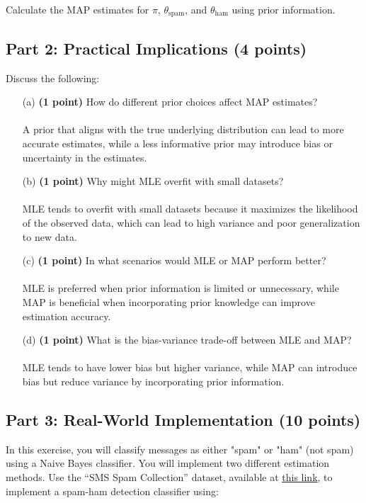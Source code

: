 \documentclass{article}
\begin{document}
\noindent Calculate the MAP estimates for $\pi$, $\theta_{\text{spam}}$, and $\theta_{\text{ham}}$ using prior information. 


\subsection*{Part 2: Practical Implications (4 points)}
Discuss the following:
\begin{enumerate}
    \item[(a)] \textbf{(1 point)} How do different prior choices affect MAP estimates?
    \\\\ A prior that aligns with the true underlying distribution can lead to more accurate estimates, while a less informative prior may introduce bias or uncertainty in the estimates.
    \item[(b)] \textbf{(1 point)} Why might MLE overfit with small datasets?
    \\\\ MLE tends to overfit with small datasets because it maximizes the likelihood of the observed data, which can lead to high variance and poor generalization to new data.
    \item[(c)] \textbf{(1 point)} In what scenarios would MLE or MAP perform better?
    \\\\ MLE is preferred when prior information is limited or unnecessary, while MAP is beneficial when incorporating prior knowledge can improve estimation accuracy.
    \item[(d)] \textbf{(1 point)} What is the bias-variance trade-off between MLE and MAP?
    \\\\ MLE tends to have lower bias but higher variance, while MAP can introduce bias but reduce variance by incorporating prior information.
\end{enumerate}

\subsection*{Part 3: Real-World Implementation (10 points)}
In this exercise, you will classify messages as either "spam" or "ham" (not spam) using a Naive Bayes classifier. You will implement two different estimation methods. Use the ``SMS Spam Collection'' dataset, available at \href{https://archive.ics.uci.edu/ml/datasets/SMS+Spam+Collection}{this link}, to implement a spam-ham detection classifier using:
\end{document}
